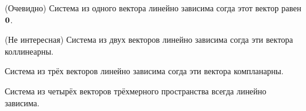 \begin{theorem}
    (Очевидно) Система из одного вектора линейно зависима согда этот вектор равен $\bm{0}$.
\end{theorem}

\begin{theorem}
    (Не интересная) Система из двух векторов линейно зависима согда эти вектора коллинеарны.
\end{theorem}

\begin{theorem}
    Система из трёх векторов линейно зависима согда эти вектора компланарны.
\end{theorem}

\begin{theorem}
    Система из четырёх векторов трёхмерного пространства всегда линейно зависима.
\end{theorem}